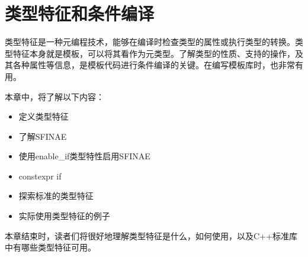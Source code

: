 \chapter{类型特征和条件编译}
类型特征是一种元编程技术，能够在编译时检查类型的属性或执行类型的转换。类型特征本身就是模板，可以将其看作为元类型。了解类型的性质、支持的操作，及其各种属性等信息，是模板代码进行条件编译的关键。在编写模板库时，也非常有用。

本章中，将了解以下内容：

\begin{itemize}
  \item 定义类型特征
  \item 了解SFINAE
  \item 使用enable\_if类型特性启用SFINAE
  \item constexpr if
  \item 探索标准的类型特征
  \item 实际使用类型特征的例子
\end{itemize}

本章结束时，读者们将很好地理解类型特征是什么，如何使用，以及C++标准库中有哪些类型特征可用。









